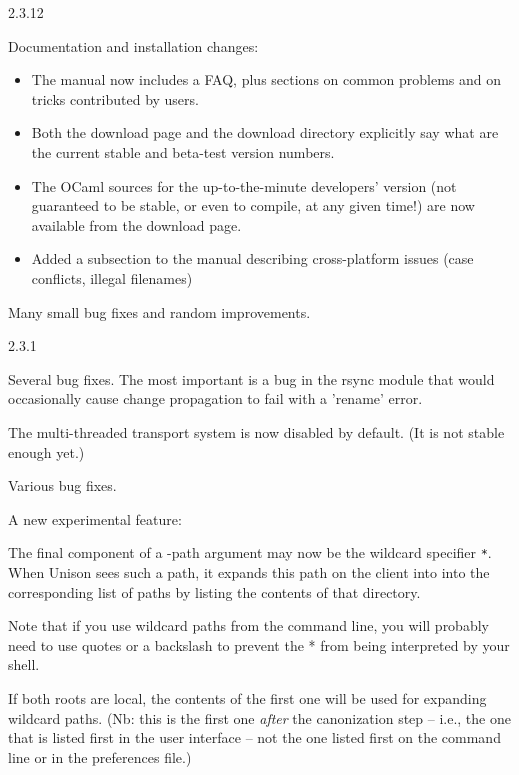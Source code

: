 \begin{changesfromversion}{2.3.12}
\item Documentation and installation changes:
\begin{itemize}
\item The manual now includes a FAQ, plus sections on common problems and
on tricks contributed by users.
\item Both the download page and the download directory explicitly say
what are the current stable and beta-test version numbers.
\item The OCaml sources for the up-to-the-minute developers' version (not
guaranteed to be stable, or even to compile, at any given time!) are now
available from the download page.
\item Added a subsection to the manual describing cross-platform
  issues (case conflicts, illegal filenames)
\end{itemize}

\item Many small bug fixes and random improvements.

\end{changesfromversion}

\begin{changesfromversion}{2.3.1}
\item Several bug fixes.  The most important is a bug in the rsync
module that would occasionally cause change propagation to fail with a
'rename' error.
\end{changesfromversion}

\begin{changesfromversion}{2.2}
\item The multi-threaded transport system is now disabled by default.
(It is not stable enough yet.)
\item Various bug fixes.
\item A new experimental feature:

  The final component of a -path argument may now be the wildcard
  specifier \verb|*|.  When Unison sees such a path, it expands this path on
  the client into into the corresponding list of paths by listing the
  contents of that directory.

  Note that if you use wildcard paths from the command line, you will
  probably need to use quotes or a backslash to prevent the * from
  being interpreted by your shell.

  If both roots are local, the contents of the first one will be used
  for expanding wildcard paths.  (Nb: this is the first one {\em after} the
  canonization step -- i.e., the one that is listed first in the user
  interface -- not the one listed first on the command line or in the
  preferences file.)
\end{changesfromversion}

